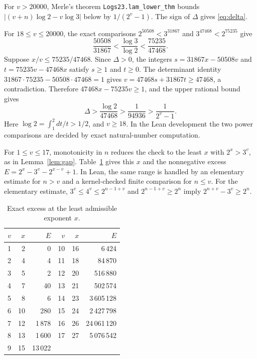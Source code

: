 \documentclass[11pt,a4paper]{amsart}
\begin{document}
For \(v>20000\), Merle's theorem \texttt{Logs23.lam\_lower\_thm}
\cite{merle} bounds \(\lvert (v+n)\log 2-v\log 3\rvert\) below
by \(1/(2^v-1)\). The sign of \(\Delta\) gives \eqref{eq:delta}.

For \(18\le v\le20000\), the exact comparisons
\(2^{50508}<3^{31867}\) and \(3^{47468}<2^{75235}\) give
\[
  \frac{50508}{31867}<\frac{\log 3}{\log 2}
     <\frac{75235}{47468}.
\]
Suppose \(x/v\le75235/47468\). Since \(\Delta>0\), the integers
\(s=31867x-50508v\) and \(t=75235v-47468x\) satisfy \(s\ge1\)
and \(t\ge0\). The determinant identity
\(31867\cdot75235-50508\cdot47468=1\) gives
\(v=47468s+31867t\ge47468\), a contradiction. Therefore
\(47468x-75235v\ge1\), and the upper rational bound gives
\[
  \Delta>\frac{\log 2}{47468}
   >\frac{1}{94936}>\frac{1}{2^v-1}.
\]
Here \(\log 2=\int_1^2 dt/t>1/2\), and \(v\ge18\).
In the Lean development the two power comparisons are decided by
exact natural-number computation.

For \(1\le v\le17\), monotonicity in \(n\) reduces the check to the least
\(x\) with \(2^x>3^v\), as in Lemma~\ref{lem:gap}.
Table~\ref{tab:small} gives this \(x\) and the nonnegative excess
\(E=2^x-3^v-2^{x-v}+1\). In Lean, the same range is handled by
an elementary estimate for \(n>v\) and a kernel-checked finite
comparison for \(n\le v\). For the elementary estimate,
\(3^v\le4^v\le2^{n-1+v}\) and
\(2^{n-1+v}\ge2^n\) imply \(2^{n+v}-3^v\ge2^n\).

\begin{table}[htbp]
  \centering
  \begin{tabular}{@{}rrr@{\qquad}rrr@{}}
    \hline
    \(v\)&\(x\)&\(E\) & \(v\)&\(x\)&\(E\)\\
    \hline
    1&2&0 & 10&16&6\,424\\
    2&4&4 & 11&18&84\,870\\
    3&5&2 & 12&20&516\,880\\
    4&7&40 & 13&21&502\,574\\
    5&8&6 & 14&23&3\,605\,128\\
    6&10&280 & 15&24&2\,427\,798\\
    7&12&1\,878 & 16&26&24\,061\,120\\
    8&13&1\,600 & 17&27&5\,076\,542\\
    9&15&13\,022 & &&\\
    \hline
  \end{tabular}
  \caption{Exact excess at the least admissible exponent \(x\).}
  \label{tab:small}
\end{table}



\end{document}
